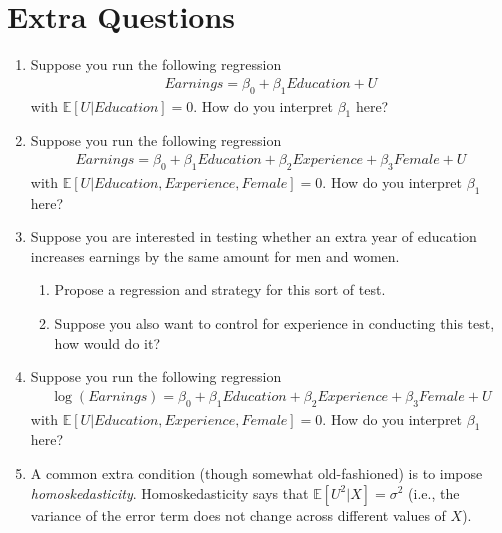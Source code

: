 \documentclass[
  letterpaper,
  DIV=11,
  numbers=noendperiod]{scrreprt}
\begin{document}
\section{Extra Questions}\label{extra-questions-2}

\begin{enumerate}
\def\labelenumi{\arabic{enumi}.}
\item
  Suppose you run the following regression \begin{align*}
    Earnings = \beta_0 + \beta_1 Education + U
  \end{align*} with \(\mathbb{E}[U|Education] = 0\). How do you
  interpret \(\beta_1\) here?
\item
  Suppose you run the following regression \begin{align*}
    Earnings = \beta_0 + \beta_1 Education + \beta_2 Experience + \beta_3 Female + U
  \end{align*} with \(\mathbb{E}[U|Education, Experience, Female] = 0\).
  How do you interpret \(\beta_1\) here?
\item
  Suppose you are interested in testing whether an extra year of
  education increases earnings by the same amount for men and women.

  \begin{enumerate}
  \def\labelenumii{\alph{enumii})}
  \item
    Propose a regression and strategy for this sort of test.
  \item
    Suppose you also want to control for experience in conducting this
    test, how would do it?
  \end{enumerate}
\item
  Suppose you run the following regression \begin{align*}
    \log(Earnings) = \beta_0 + \beta_1 Education + \beta_2 Experience + \beta_3 Female + U
  \end{align*} with \(\mathbb{E}[U|Education, Experience, Female] = 0\).
  How do you interpret \(\beta_1\) here?
\item
  A common extra condition (though somewhat old-fashioned) is to impose
  \emph{homoskedasticity}. Homoskedasticity says that
  \(\mathbb{E}[U^2|X] = \sigma^2\) (i.e., the variance of the error term
  does not change across different values of \(X\)).


\end{enumerate}
\end{document}
